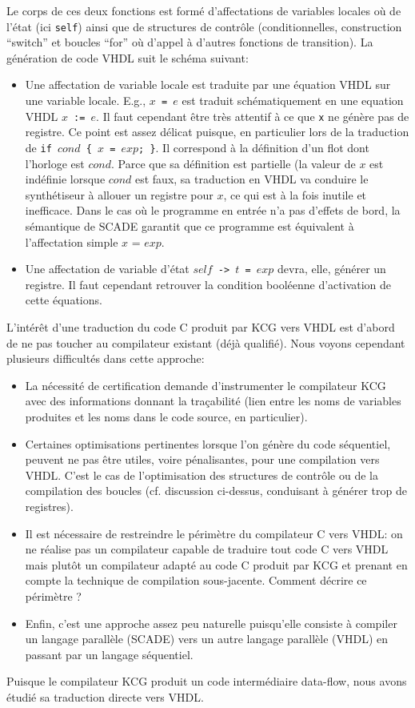 \documentclass[a4paper]{article}
\begin{document}
Le corps de ces deux fonctions est form\'e d'affectations de variables
locales o\`u de l'\'etat (ici \texttt{self}) ainsi que de structures de contr\^ole
(conditionnelles, construction ``switch'' et boucles ``for'' o\`u
d'appel \`a d'autres fonctions de transition). La
g\'en\'eration de code VHDL suit le sch\'ema suivant:
\begin{itemize}
\item
Une affectation de variable locale
est traduite par une \'equation VHDL sur une variable locale. E.g.,
\texttt{$x$ = $e$} est traduit sch\'ematiquement en une equation VHDL \texttt{$x$ := $e$}.
Il faut cependant \^etre tr\`es attentif \`a ce que \verb-x- ne g\'en\`ere pas de registre.
Ce point est assez d\'elicat puisque, en particulier lors de la traduction de
\texttt{if $cond$ \{ $x$ = $exp$; \}}. Il correspond \`a la d\'efinition d'un flot
dont l'horloge est $cond$. Parce que sa d\'efinition est partielle (la valeur de
$x$ est ind\'efinie lorsque $cond$ est faux, sa traduction en VHDL va conduire le
synth\'etiseur \`a allouer un registre pour $x$, ce qui est \`a la fois inutile et inefficace.
Dans le cas o\`u le programme en entr\'ee n'a pas d'effets de bord, la s\'emantique de
SCADE garantit que ce programme est \'equivalent \`a l'affectation simple $x$ = $exp$.
\item
Une affectation de variable d'\'etat \texttt{$self$ -> $t$ = $exp$} devra, elle,
g\'en\'erer un registre. Il faut cependant retrouver la condition bool\'eenne d'activation
de cette \'equations.
\end{itemize}
L'int\'er\^et d'une traduction du code C produit par KCG vers VHDL est
d'abord de ne pas toucher au compilateur existant (d\'ej\`a qualifi\'e). Nous voyons
cependant plusieurs difficult\'es dans cette approche:
\begin{itemize}
\item
La n\'ecessit\'e de certification demande d'instrumenter
le compilateur KCG avec des informations donnant la tra\c{c}abilit\'e (lien
entre les noms de variables produites et les noms dans le code source,
en particulier).
\item
Certaines optimisations pertinentes lorsque l'on g\'en\`ere du
code s\'equentiel, peuvent ne pas \^etre utiles, voire p\'enalisantes, pour une compilation
vers VHDL. C'est le cas de l'optimisation des structures de contr\^ole
ou de la compilation des boucles (cf. discussion ci-dessus, conduisant \`a g\'en\'erer
trop de registres).
\item
Il est n\'ecessaire de restreindre le p\'erim\`etre du compilateur C vers VHDL: on
ne r\'ealise pas un compilateur capable de traduire tout code C vers VHDL mais
plut\^ot un compilateur adapt\'e au code C produit par KCG et prenant en compte
la technique de compilation sous-jacente. Comment d\'ecrire ce p\'erim\`etre ?
\item
Enfin, c'est une approche assez peu naturelle puisqu'elle
consiste \`a compiler un langage parall\`ele (SCADE) vers un autre langage parall\`ele
(VHDL) en passant par un langage s\'equentiel.
\end{itemize}
Puisque le compilateur KCG produit un code interm\'ediaire data-flow, nous
avons \'etudi\'e sa traduction directe vers VHDL.
\end{document}
